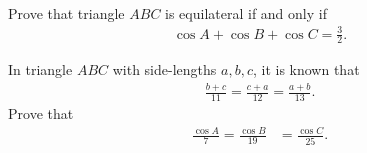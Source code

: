 \begin{question}[name=Exercises in Law of Sines and Law of Cosines]
\begin{tasks}
\begin{align*}
    \end{align*}
    \end{tasks}
\end{question}

\begin{question}[name=1984 IIT JEE]
    Prove that triangle $ABC$ is equilateral if and only if
    \begin{align*}
        \cos A + \cos B + \cos C = \frac{3}{2}.
    \end{align*}
\end{question}

\begin{question}[name=1984 IIT JEE]
    In triangle $ABC$ with side-lengths $a,b,c$, it is known that
    \begin{align*}
        \frac{b+c}{11}=\frac{c+a}{12}=\frac{a+b}{13}.
    \end{align*}
    Prove that
    \begin{align*}
        \frac{\cos A}{7} = \frac{\cos B}{19} &= \frac{\cos C}{25}.
    \end{align*}
\end{question}




